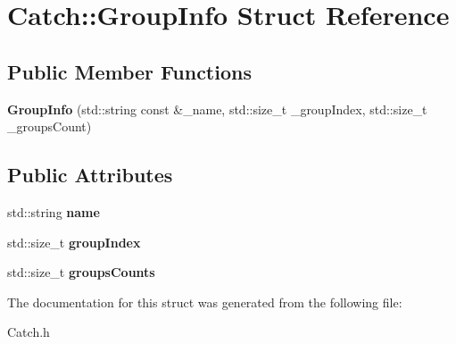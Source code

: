 \hypertarget{struct_catch_1_1_group_info}{\section{Catch\-:\-:Group\-Info Struct Reference}
\label{struct_catch_1_1_group_info}
}
\subsection*{Public Member Functions}
\begin{DoxyCompactItemize}
\item 
\hypertarget{struct_catch_1_1_group_info_a608ac0388b6f55def5908d464c1c1e24}{{\bfseries Group\-Info} (std\-::string const \&\-\_\-name, std\-::size\-\_\-t \-\_\-group\-Index, std\-::size\-\_\-t \-\_\-groups\-Count)}\label{struct_catch_1_1_group_info_a608ac0388b6f55def5908d464c1c1e24}

\end{DoxyCompactItemize}
\subsection*{Public Attributes}
\begin{DoxyCompactItemize}
\item 
\hypertarget{struct_catch_1_1_group_info_a9297e37e27c4e5fd207cfa709f500967}{std\-::string {\bfseries name}}\label{struct_catch_1_1_group_info_a9297e37e27c4e5fd207cfa709f500967}

\item 
\hypertarget{struct_catch_1_1_group_info_a1ecdd754e485375ea04ed6153284d987}{std\-::size\-\_\-t {\bfseries group\-Index}}\label{struct_catch_1_1_group_info_a1ecdd754e485375ea04ed6153284d987}

\item 
\hypertarget{struct_catch_1_1_group_info_a99144c7e35b86792dbf922f636629330}{std\-::size\-\_\-t {\bfseries groups\-Counts}}\label{struct_catch_1_1_group_info_a99144c7e35b86792dbf922f636629330}

\end{DoxyCompactItemize}


The documentation for this struct was generated from the following file\-:\begin{DoxyCompactItemize}
\item 
Catch.\-h\end{DoxyCompactItemize}
